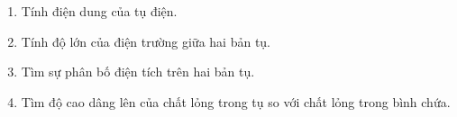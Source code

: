 \begin{vd}
\begin{center}

    \end{center}
    \begin{enumerate}[1)]
        \item Tính điện dung của tụ điện.
        \item Tính độ lớn của điện trường giữa hai bản tụ.
        \item Tìm sự phân bố điện tích trên hai bản tụ.
        \item Tìm độ cao dâng lên của chất lỏng trong tụ so với chất lỏng trong bình chứa.
    \end{enumerate}
\end{vd}
